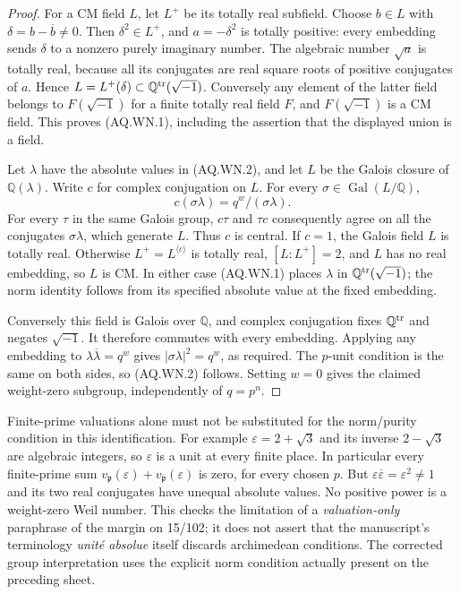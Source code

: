 \begin{proof}
For a CM field $L$, let $L^+$ be its totally real
subfield.  Choose $b\in L$ with
$\delta=b-\overline b\ne0$.  Then
$\delta^2\in L^+$, and $a=-\delta^2$ is totally positive:
every embedding sends $\delta$ to a nonzero purely
imaginary number.  The algebraic number $\sqrt a$
is totally real, because all its conjugates are real
square roots of positive conjugates of $a$.
Hence
$L=L^+(\delta)\subset\mathbb Q^{\rm tr}(\sqrt{-1})$.
Conversely any element of the latter field belongs to
$F(\sqrt{-1})$ for a finite totally real field $F$,
and $F(\sqrt{-1})$ is a CM field.  This proves (AQ.WN.1),
including the assertion that the displayed union is a field.

Let $\lambda$ have the absolute values in (AQ.WN.2),
and let $L$ be the Galois closure of $\mathbb Q(\lambda)$.
Write $c$ for complex conjugation on $L$.
For every $\sigma\in\operatorname{Gal}(L/\mathbb Q)$,
\[
 c(\sigma\lambda)=q^w/(\sigma\lambda).
\]
For every $\tau$ in the same Galois group,
$c\tau$ and $\tau c$ consequently agree on all the
conjugates $\sigma\lambda$, which generate $L$.
Thus $c$ is central.
If $c=1$, the Galois field $L$ is totally real.
Otherwise $L^+=L^{\langle c\rangle}$ is totally real,
$[L:L^+]=2$, and $L$ has no real embedding, so $L$ is CM.
In either case (AQ.WN.1) places $\lambda$ in
$\mathbb Q^{\rm tr}(\sqrt{-1})$; the norm identity follows
from its specified absolute value at the fixed embedding.

Conversely this field is Galois over $\mathbb Q$, and
complex conjugation fixes $\mathbb Q^{\rm tr}$ and
negates $\sqrt{-1}$.  It therefore commutes with every
embedding.  Applying any embedding to
$\lambda\overline\lambda=q^w$ gives
$|\sigma\lambda|^2=q^w$, as required.
The $p$-unit condition is the same on both sides,
so (AQ.WN.2) follows.  Setting $w=0$ gives the claimed
weight-zero subgroup, independently of $q=p^n$.
\end{proof}

Finite-prime valuations alone must not be substituted
for the norm/purity condition in this identification.
For example $\varepsilon=2+\sqrt3$ and its inverse
$2-\sqrt3$ are algebraic integers, so $\varepsilon$
is a unit at every finite place.  In particular every
finite-prime sum $v_{\mathfrak p}(\varepsilon)+
v_{\overline{\mathfrak p}}(\varepsilon)$ is zero,
for every chosen $p$.  But
$\varepsilon\overline\varepsilon=\varepsilon^2\ne1$
and its two real conjugates have unequal absolute values.
No positive power is a weight-zero Weil number.
This checks the limitation of a \emph{valuation-only}
paraphrase of the margin on 15/102; it does not assert
that the manuscript's terminology \emph{unit\'e absolue}
itself discards archimedean conditions.
The corrected group interpretation uses the explicit
norm condition actually present on the preceding sheet.

